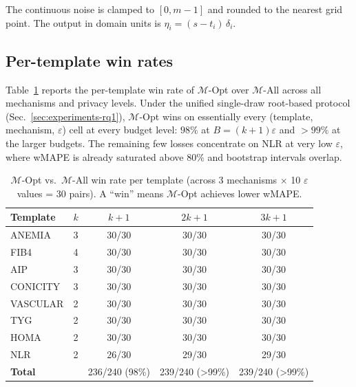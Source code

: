 The continuous noise is clamped to $[0, m{-}1]$ and rounded to the nearest grid point. The output in domain units is $\eta_i = (s - t_i)\,\delta_i$.

\subsection{Per-template win rates}
\label{app:rq3-winrate}
 
Table~\ref{tab:rq1_win_rate} reports the per-template win rate of $\mathcal{M}$-Opt over $\mathcal{M}$-All across all mechanisms and privacy levels. Under the unified single-draw root-based protocol (Sec.~\ref{sec:experiments-rq1}), $\mathcal{M}$-Opt wins on essentially every (template, mechanism, $\varepsilon$) cell at every budget level: $98\%$ at $B = (k{+}1)\varepsilon$ and $> 99\%$ at the larger budgets. The remaining few losses concentrate on NLR at very low $\varepsilon$, where wMAPE is already saturated above $80\%$ and bootstrap intervals overlap.
 
\begin{table}[t]
\centering
\small
\caption{$\mathcal{M}$-Opt vs.\ $\mathcal{M}$-All win rate per template (across 3 mechanisms $\times$ 10 $\varepsilon$ values = 30 pairs). A ``win'' means $\mathcal{M}$-Opt achieves lower wMAPE.}
\label{tab:rq1_win_rate}
\begin{tabular}{lcccc}
\toprule
\textbf{Template} & $k$ & $k{+}1$ & $2k{+}1$ & $3k{+}1$ \\
\midrule
ANEMIA   & 3 & 30/30 & 30/30 & 30/30 \\
FIB4     & 4 & 30/30 & 30/30 & 30/30 \\
AIP      & 3 & 30/30 & 30/30 & 30/30 \\
CONICITY & 3 & 30/30 & 30/30 & 30/30 \\
VASCULAR & 2 & 30/30 & 30/30 & 30/30 \\
TYG      & 2 & 30/30 & 30/30 & 30/30 \\
HOMA     & 2 & 30/30 & 30/30 & 30/30 \\
NLR      & 2 & 26/30 & 29/30 & 29/30 \\
\midrule
\textbf{Total} & & 236/240 (98\%) & 239/240 (>99\%) & 239/240 (>99\%) \\
\bottomrule
\end{tabular}
\end{table}

 
